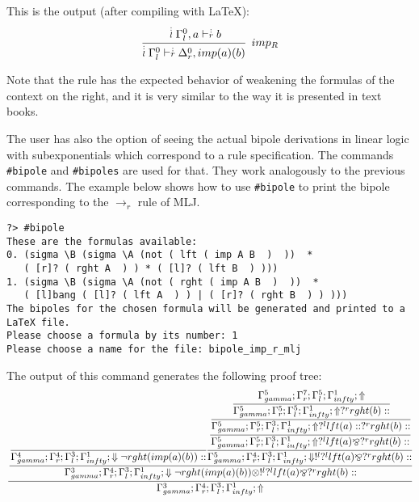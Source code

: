 \documentclass{llncs}
\newcommand{\ndots}[1]{\stackrel{\vcenter{\hbox{$\scriptstyle :$}\vskip-.35ex}}
   {\hbox {$ \scriptstyle {#1}$}}}
\begin{document}
This is the output (after compiling with \LaTeX):
%
{\small
\[
\cfrac{ \ndots{l} \Gamma_{l}^{0}, a \vdash  \ndots{r} b}
{ \ndots{l} \Gamma_{l}^{0} \vdash  \ndots{r} \Delta_{r}^{0}, imp (a) (b) } \;\; imp_{R}
\]
}

Note that the rule has the expected behavior of weakening the formulas of the
context on the right, and it is very similar to the way it is presented in text
books.

The user has also the option of seeing the actual bipole derivations in linear
logic with subexponentials which correspond to a rule specification. The
commands \texttt{\#bipole} and \texttt{\#bipoles} are used for that. They work
analogously to the previous commands. The example below shows how to use
\texttt{\#bipole} to print the bipole corresponding to the $\rightarrow_r$ rule
of MLJ.
\vspace{-1mm}

{\small
\begin{verbatim}
?> #bipole 
These are the formulas available: 
0. (sigma \B (sigma \A (not ( lft ( imp A B  )  ))  * 
   ( [r]? ( rght A  ) ) * ( [l]? ( lft B  ) )))
1. (sigma \B (sigma \A (not ( rght ( imp A B  )  ))  * 
   ( [l]bang ( [l]? ( lft A  ) ) | ( [r]? ( rght B  ) ) )))
The bipoles for the chosen formula will be generated and printed to a LaTeX file.
Please choose a formula by its number: 1
Please choose a name for the file: bipole_imp_r_mlj
\end{verbatim}
}

The output of this command generates the following proof tree:
%
{\scriptsize\[\cfrac{\cfrac{\cfrac{}
{\Gamma_{ gamma}^{4} ; \Gamma_{r}^{4} ; \Gamma_{l}^{3} ; \Gamma_{ infty}^{1} ;  \Downarrow \neg rght (imp (a) (b) )  :: }\cfrac{\cfrac{\cfrac{\cfrac{\Gamma_{ gamma}^{5} ; \Gamma_{r}^{7} ; \Gamma_{l}^{5} ; \Gamma_{ infty}^{1} ;  \Uparrow }
{\Gamma_{ gamma}^{5} ; \Gamma_{r}^{5} ; \Gamma_{l}^{5} ; \Gamma_{ infty}^{1} ;  \Uparrow  ?^{r} rght (b)  :: }}
{\Gamma_{ gamma}^{5} ; \Gamma_{r}^{5} ; \Gamma_{l}^{3} ; \Gamma_{ infty}^{1} ;  \Uparrow  ?^{l} lft (a)  ::  ?^{r} rght (b)  :: }}
{\Gamma_{ gamma}^{5} ; \Gamma_{r}^{5} ; \Gamma_{l}^{3} ; \Gamma_{ infty}^{1} ;  \Uparrow  ?^{l} lft (a)  \bindnasrepma  ?^{r} rght (b)  :: }}
{\Gamma_{ gamma}^{5} ; \Gamma_{r}^{4} ; \Gamma_{l}^{3} ; \Gamma_{ infty}^{1} ;  \Downarrow  !^{l}  ?^{l} lft (a)  \bindnasrepma  ?^{r} rght (b)  :: }}
{\Gamma_{ gamma}^{3} ; \Gamma_{r}^{4} ; \Gamma_{l}^{3} ; \Gamma_{ infty}^{1} ;  \Downarrow \neg rght (imp (a) (b) )  \otimes  !^{l}  ?^{l} lft (a)  \bindnasrepma  ?^{r} rght (b)  :: }}
{\Gamma_{ gamma}^{3} ; \Gamma_{r}^{4} ; \Gamma_{l}^{3} ; \Gamma_{ infty}^{1} ; \Uparrow }\]}
\end{document}
